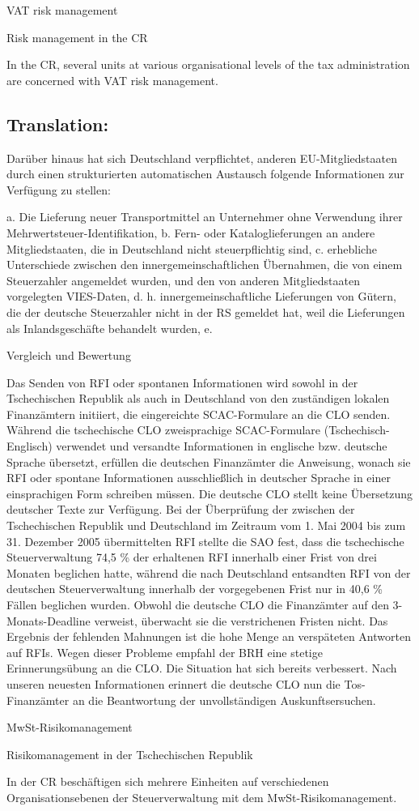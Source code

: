 \documentclass[10pt]{article}
\begin{document}
VAT risk management



Risk management in the CR

In the CR, several units at various organisational levels of the tax administration are concerned with VAT risk management.


\pagebreak

\subsection*{Translation:}



Darüber hinaus hat sich Deutschland verpflichtet, anderen EU-Mitgliedstaaten durch einen strukturierten automatischen Austausch folgende Informationen zur Verfügung zu stellen:

a. Die Lieferung neuer Transportmittel an Unternehmer ohne Verwendung ihrer Mehrwertsteuer-Identifikation, b. Fern- oder Kataloglieferungen an andere Mitgliedstaaten, die in Deutschland nicht steuerpflichtig sind, c. erhebliche Unterschiede zwischen den innergemeinschaftlichen Übernahmen, die von einem Steuerzahler angemeldet wurden, und den von anderen Mitgliedstaaten vorgelegten VIES-Daten, d. h. innergemeinschaftliche Lieferungen von Gütern, die der deutsche Steuerzahler nicht in der RS gemeldet hat, weil die Lieferungen als Inlandsgeschäfte behandelt wurden, e.


Vergleich und Bewertung

Das Senden von RFI oder spontanen Informationen wird sowohl in der Tschechischen Republik als auch in Deutschland von den zuständigen lokalen Finanzämtern initiiert, die eingereichte SCAC-Formulare an die CLO senden.
Während die tschechische CLO zweisprachige SCAC-Formulare (Tschechisch-Englisch) verwendet und versandte Informationen in englische bzw. deutsche Sprache übersetzt, erfüllen die deutschen Finanzämter die Anweisung, wonach sie RFI oder spontane Informationen ausschließlich in deutscher Sprache in einer einsprachigen Form schreiben müssen.
Die deutsche CLO stellt keine Übersetzung deutscher Texte zur Verfügung.
Bei der Überprüfung der zwischen der Tschechischen Republik und Deutschland im Zeitraum vom 1. Mai 2004 bis zum 31. Dezember 2005 übermittelten RFI stellte die SAO fest, dass die tschechische Steuerverwaltung 74,5 \% der erhaltenen RFI innerhalb einer Frist von drei Monaten beglichen hatte, während die nach Deutschland entsandten RFI von der deutschen Steuerverwaltung innerhalb der vorgegebenen Frist nur in 40,6 \% Fällen beglichen wurden.
Obwohl die deutsche CLO die Finanzämter auf den 3-Monats-Deadline verweist, überwacht sie die verstrichenen Fristen nicht.
Das Ergebnis der fehlenden Mahnungen ist die hohe Menge an verspäteten Antworten auf RFIs.
Wegen dieser Probleme empfahl der BRH eine stetige Erinnerungsübung an die CLO.
Die Situation hat sich bereits verbessert.
Nach unseren neuesten Informationen erinnert die deutsche CLO nun die Tos-Finanzämter an die Beantwortung der unvollständigen Auskunftsersuchen.


MwSt-Risikomanagement



Risikomanagement in der Tschechischen Republik

In der CR beschäftigen sich mehrere Einheiten auf verschiedenen Organisationsebenen der Steuerverwaltung mit dem MwSt-Risikomanagement.
\end{document}
